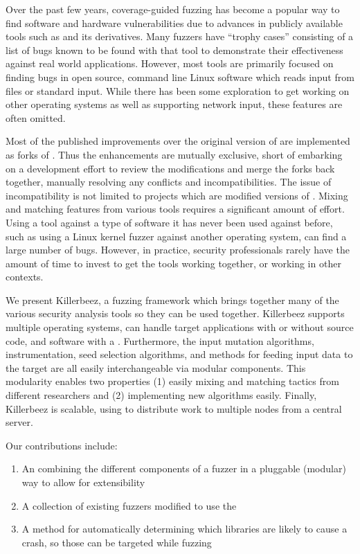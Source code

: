 Over the past few years, coverage-guided fuzzing has become a popular way to
find software and hardware vulnerabilities due to advances in publicly
available tools such as \AFL{}\cite{afl} and its derivatives.\cite{vanhauser} Many
fuzzers have ``trophy cases'' consisting of a list of bugs known to be found with that tool to
demonstrate their effectiveness against real world applications.  However, most
tools are primarily focused on finding bugs in open source, command line Linux
software which reads input from files or standard input. While there has been some
exploration to get \AFL{} working on other operating
systems\cite{aflosx}\cite{winafl} as well as supporting network
input,\cite{netafl}\cite{preeny} these features are often omitted.

Most of the published improvements over the original version of \AFL{} are
implemented as forks of
\AFL{}.\cite{aflfast}\cite{aflgo}\cite{fairfuzz}\cite{perffuzz}\cite{pythia}\cite{collafl}
Thus the enhancements are mutually exclusive, short of embarking on a
development effort to review the modifications and merge the forks back
together, manually resolving any conflicts and incompatibilities.  The issue
of incompatibility is not limited to projects which are modified versions of
\AFL{}. Mixing and matching features from various tools requires a significant
amount of effort. Using a tool against a type of software it has never been
used against before, such as using a Linux kernel fuzzer against another
operating system, can find a large number of bugs\cite{anton}.  However, in practice, security
professionals rarely have the amount of time to invest to get the tools working
together, or working in other contexts.

We present Killerbeez, a fuzzing framework which brings together many of the
various security analysis tools so they can be used together.  Killerbeez
supports multiple operating systems, can handle target applications with or
without source code, and software with a \GUI{}.
Furthermore, the input mutation algorithms, instrumentation, seed selection
algorithms, and methods for feeding input data to the target are all easily
interchangeable via modular components.  This modularity enables two
properties (1) easily mixing and matching
tactics from different researchers and (2) implementing new algorithms easily.
Finally, Killerbeez is scalable, using \BOINC{}\cite{boinc} to distribute work
to multiple nodes from a central server.

Our contributions include:
\begin{enumerate}[noitemsep]
\item An \API{} combining the different components of a fuzzer in a pluggable (modular) way to allow for extensibility
\item A collection of existing fuzzers modified to use the \API{}
\item A method for automatically determining which libraries are likely to
	cause a crash, so those can be targeted while fuzzing
\end{enumerate}

